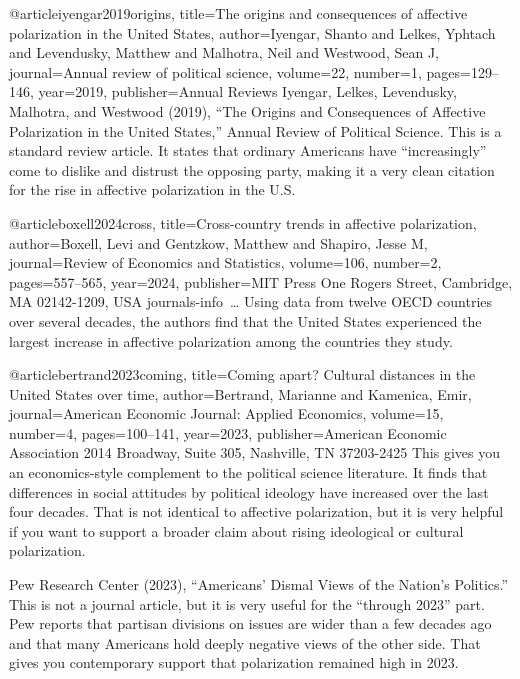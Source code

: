@article{iyengar2019origins,
  title={The origins and consequences of affective polarization in the United States},
  author={Iyengar, Shanto and Lelkes, Yphtach and Levendusky, Matthew and Malhotra, Neil and Westwood, Sean J},
  journal={Annual review of political science},
  volume={22},
  number={1},
  pages={129--146},
  year={2019},
  publisher={Annual Reviews}
}
Iyengar, Lelkes, Levendusky, Malhotra, and Westwood (2019), “The Origins and Consequences of Affective Polarization in the United States,” Annual Review of Political Science.
This is a standard review article. It states that ordinary Americans have “increasingly” come to dislike and distrust the opposing party, making it a very clean citation for the rise in affective polarization in the U.S.

@article{boxell2024cross,
  title={Cross-country trends in affective polarization},
  author={Boxell, Levi and Gentzkow, Matthew and Shapiro, Jesse M},
  journal={Review of Economics and Statistics},
  volume={106},
  number={2},
  pages={557--565},
  year={2024},
  publisher={MIT Press One Rogers Street, Cambridge, MA 02142-1209, USA journals-info~…}
}
Using data from twelve OECD countries over several decades, the authors find that the United States experienced the largest increase in affective polarization among the countries they study.

@article{bertrand2023coming,
  title={Coming apart? Cultural distances in the United States over time},
  author={Bertrand, Marianne and Kamenica, Emir},
  journal={American Economic Journal: Applied Economics},
  volume={15},
  number={4},
  pages={100--141},
  year={2023},
  publisher={American Economic Association 2014 Broadway, Suite 305, Nashville, TN 37203-2425}
}
This gives you an economics-style complement to the political science literature. It finds that differences in social attitudes by political ideology have increased over the last four decades. That is not identical to affective polarization, but it is very helpful if you want to support a broader claim about rising ideological or cultural polarization.


Pew Research Center (2023), “Americans’ Dismal Views of the Nation’s Politics.”
This is not a journal article, but it is very useful for the “through 2023” part. Pew reports that partisan divisions on issues are wider than a few decades ago and that many Americans hold deeply negative views of the other side. That gives you contemporary support that polarization remained high in 2023.

